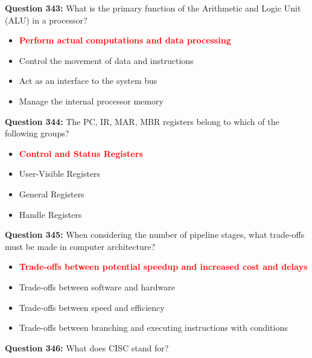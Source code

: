 \documentclass[12pt,a4paper]{article}
\begin{document}
\vspace{0.5cm}

\textbf{Question 343:} What is the primary function of the Arithmetic and Logic Unit (ALU) in a processor?

\begin{itemize}
    \item[\textbf{A.}] \textcolor{red}{\textbf{Perform actual computations and data processing}}
    \item[\textbf{B.}] Control the movement of data and instructions
    \item[\textbf{C.}] Act as an interface to the system bus
    \item[\textbf{D.}] Manage the internal processor memory
\end{itemize}

\vspace{0.5cm}

\textbf{Question 344:} The PC, IR, MAR, MBR registers belong to which of the following groups?

\begin{itemize}
    \item[\textbf{A.}] \textcolor{red}{\textbf{Control and Status Registers}}
    \item[\textbf{B.}] User-Visible Registers
    \item[\textbf{C.}] General Registers
    \item[\textbf{D.}] Handle Registers
\end{itemize}

\vspace{0.5cm}

\textbf{Question 345:} When considering the number of pipeline stages, what trade-offs must be made in computer architecture?

\begin{itemize}
    \item[\textbf{A.}] \textcolor{red}{\textbf{Trade-offs between potential speedup and increased cost and delays}}
    \item[\textbf{B.}] Trade-offs between software and hardware
    \item[\textbf{C.}] Trade-offs between speed and efficiency
    \item[\textbf{D.}] Trade-offs between branching and executing instructions with conditions
\end{itemize}

\vspace{0.5cm}

\textbf{Question 346:} What does CISC stand for?
\end{document}
